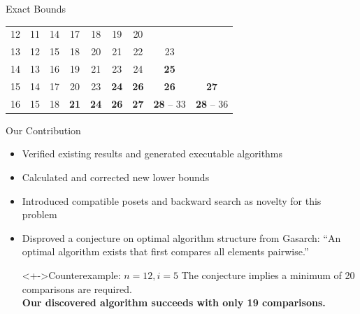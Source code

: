 \begin{frame}{Exact Bounds}
\begin{table}[!t]
\begin{tabular}{c|cccccccc}
      12  & 11                      & 14 & 17          & 18          & 19          & 20                                                  \\
      13  & 12                      & 15 & 18          & 20          & 21          & 22          & 23                                    \\
      14  & 13                      & 16 & 19          & 21          & 23          & 24          & \textbf{25}                           \\
      15  & 14                      & 17 & 20          & 23          & \textbf{24} & \textbf{26} & \textbf{26}       & \textbf{27}       \\
      16  & 15                      & 18 & \textbf{21} & \textbf{24} & \textbf{26} & \textbf{27} & \textbf{28} -- 33 & \textbf{28} -- 36 \\
    \end{tabular}
  \end{table}
\end{frame}

\begin{frame}{Our Contribution}
  \begin{itemize}
    \item<+-> Verified existing results and generated executable algorithms
    \item<+-> Calculated and corrected new lower bounds
    \item<+-> Introduced compatible posets and backward search as novelty for this problem
    \item<+-> Disproved a conjecture on optimal algorithm structure from Gasarch:
      ``An optimal algorithm exists that first compares all elements pairwise.''
      \begin{alertblock}<+->{Counterexample: $n=12, i=5$}
        The conjecture implies a minimum of 20 comparisons are required. \\[0.5em]
        \textbf{Our discovered algorithm succeeds with only \textcolor{counterexample}{19} comparisons.}
      \end{alertblock}
  \end{itemize}
\end{frame}

